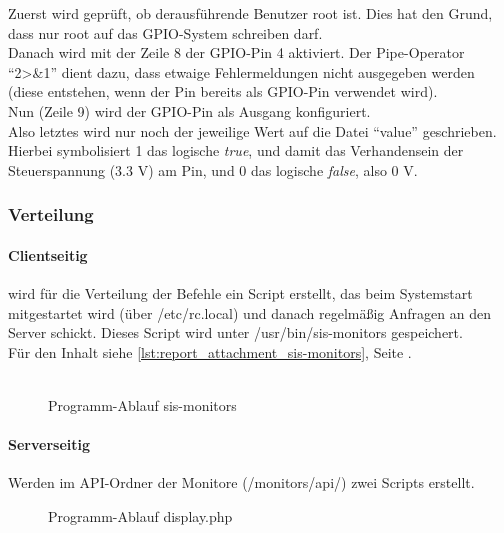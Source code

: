 Zuerst wird geprüft, ob derausführende Benutzer root ist. Dies hat den Grund, dass nur root auf das GPIO-System schreiben darf.\\
Danach wird mit der Zeile 8 der GPIO-Pin 4 aktiviert. Der Pipe-Operator \enquote{2>\&1} dient dazu, dass etwaige Fehlermeldungen nicht ausgegeben werden (diese entstehen, wenn der Pin bereits als GPIO-Pin verwendet wird).\\
Nun (Zeile 9) wird der GPIO-Pin als Ausgang konfiguriert.\\
Also letztes wird nur noch der jeweilige Wert auf die Datei \enquote{value} geschrieben. Hierbei symbolisiert 1 das logische \textit{true}, und damit das Verhandensein der Steuerspannung (3.3 V) am Pin, und 0 das logische \textit{false}, also 0 V.

\subsubsection{Verteilung}

\paragraph{Clientseitig}
wird für die Verteilung der Befehle ein Script erstellt, das beim Systemstart mitgestartet wird (über /etc/rc.local) und danach regelmäßig Anfragen an den Server schickt.
Dieses Script wird unter /usr/bin/sis-monitors gespeichert.\\
Für den Inhalt siehe \autoref{lst:report_attachment_sis-monitors}, Seite \pageref{lst:report_attachment_sis-monitors}.\\
\\
\begin{figure}[H]
\centering
{}
\caption{Programm-Ablauf sis-monitors}
\label{fig:report_software_sis-monitors}
\end{figure}

\paragraph{Serverseitig}
Werden im API-Ordner der Monitore (/monitors/api/) zwei Scripts erstellt.

\begin{figure}[H]
\centering
{}
\caption{Programm-Ablauf display.php}
\label{fig:report_software_sis-display}
\end{figure}


